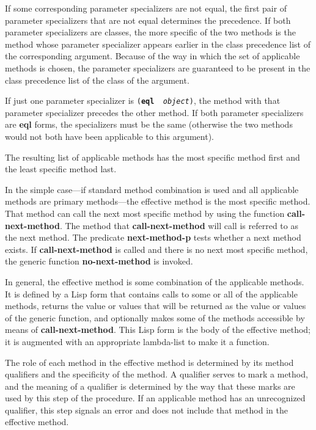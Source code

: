 If some corresponding parameter specializers are not equal, the first
pair of parameter specializers that are not equal determines the
precedence.  If both parameter specializers are classes, the more
specific of the two methods is the method whose parameter specializer
appears earlier in the class precedence list of the corresponding
argument.  Because of the way in which the set of applicable methods
is chosen, the parameter specializers are guaranteed to be present in
the class precedence list of the class of the argument.

If just one parameter specializer is {\tt ({\bf eql} {\it
object\/})}, the method with that parameter specializer precedes the
other method.  If both parameter specializers are {\bf eql}
forms, the
specializers must be the same (otherwise the two methods would
not both have been applicable to this argument).

The resulting list of applicable methods has the most specific
method first and the least specific method last.    

\endsubsubsection%


In the simple case---if standard method combination is used and all
applicable methods are primary methods---the effective method is the
most specific method.  That method can call the next most specific
method by using the function {\bf call-next-method}.  The method that
{\bf call-next-method} will call is referred to as the {\bit next
method}.  The predicate {\bf next-method-p} tests whether a next
method exists.  If {\bf call-next-method} is called and there is no
next most specific method, the generic function {\bf no-next-method}
is invoked.

In general, the effective method is some combination of the applicable
methods.  It is defined by a Lisp form that contains calls to some or all
of the applicable methods, returns the value or values that will be
returned as the value or values of the generic function, and optionally
makes some of the methods accessible by means of {\bf call-next-method}.
This Lisp form is the body of the effective method; it is augmented with
an appropriate lambda-list to make it a function.

The role of each method in the effective method is determined by its
method qualifiers and the specificity of the method.  A qualifier
serves to mark a method, and the meaning of a qualifier is
determined by the way that these marks are used by this step
of the procedure.  If an applicable method has an unrecognized
qualifier, this step signals an error and does not include that method
in the effective method.


